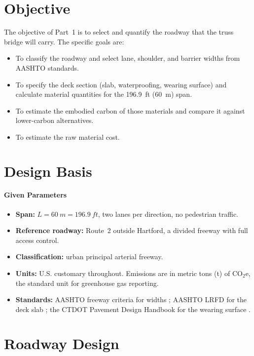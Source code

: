\documentclass[11pt]{article}
\begin{document}
\section{Objective}
The objective of Part~1 is to select and quantify the roadway that the truss bridge will carry. The specific goals are:
\begin{itemize}
    \item To classify the roadway and select lane, shoulder, and barrier widths from AASHTO standards.
    \item To specify the deck section (slab, waterproofing, wearing surface) and calculate material quantities for the \SI{196.9}{ft} (\SI{60}{m}) span.
    \item To estimate the embodied carbon of those materials and compare it against lower-carbon alternatives.
    \item To estimate the raw material cost.
\end{itemize}

\section{Design Basis}
\paragraph{Given Parameters}
\begin{itemize}
    \item \textbf{Span:} $L = \SI{60}{m} = \SI{196.9}{ft}$, two lanes per direction, no pedestrian traffic.
    \item \textbf{Reference roadway:} Route~2 outside Hartford, a divided freeway with full access control.
    \item \textbf{Classification:} urban principal arterial freeway.
    \item \textbf{Units:} U.S. customary throughout. Emissions are in metric tons (t) of CO$_2$e, the standard unit for greenhouse gas reporting.
    \item \textbf{Standards:} AASHTO freeway criteria for widths \cite{fhwa_pts}; AASHTO LRFD for the deck slab \cite{fhwa_deck}; the CTDOT Pavement Design Handbook for the wearing surface \cite{ctdot_pdh}.
\end{itemize}

\section{Roadway Design}
\end{document}
